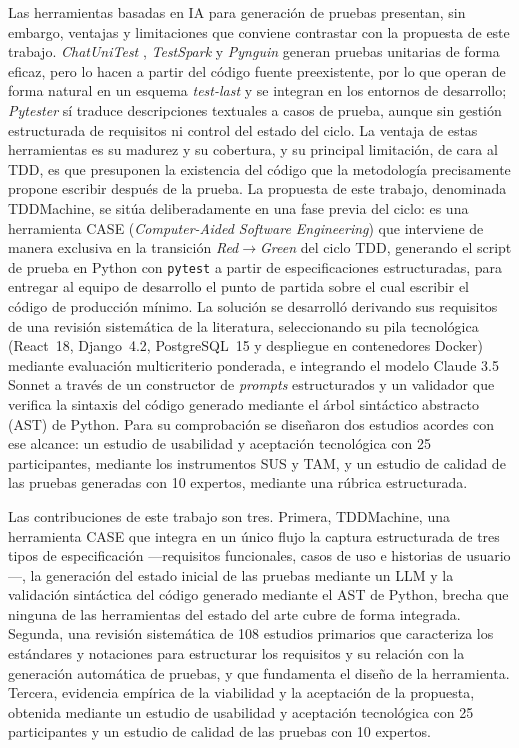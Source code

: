 \documentclass[10pt,journal,twoside,letterpaper]{IEEEtran}
\begin{document}
	Las herramientas basadas en IA para generación de pruebas presentan, sin embargo, ventajas y limitaciones que conviene contrastar con la propuesta de este trabajo. \emph{ChatUniTest} \cite{chen2024chatunitest}, \emph{TestSpark} \cite{sapozhnikov2024testspark} y \emph{Pynguin} \cite{lukasczyk2022pynguin} generan pruebas unitarias de forma eficaz, pero lo hacen a partir del código fuente preexistente, por lo que operan de forma natural en un esquema \emph{test-last} y se integran en los entornos de desarrollo; \emph{Pytester} \cite{takerngsaksiri2025pytester} sí traduce descripciones textuales a casos de prueba, aunque sin gestión estructurada de requisitos ni control del estado del ciclo. La ventaja de estas herramientas es su madurez y su cobertura, y su principal limitación, de cara al TDD, es que presuponen la existencia del código que la metodología precisamente propone escribir después de la prueba. La propuesta de este trabajo, denominada TDDMachine, se sitúa deliberadamente en una fase previa del ciclo: es una herramienta CASE (\emph{Computer-Aided Software Engineering}) que interviene de manera exclusiva en la transición \emph{Red}$\rightarrow$\emph{Green} del ciclo TDD, generando el script de prueba en Python con \texttt{pytest} a partir de especificaciones estructuradas, para entregar al equipo de desarrollo el punto de partida sobre el cual escribir el código de producción mínimo. La solución se desarrolló derivando sus requisitos de una revisión sistemática de la literatura, seleccionando su pila tecnológica (React~18, Django~4.2, PostgreSQL~15 y despliegue en contenedores Docker) mediante evaluación multicriterio ponderada, e integrando el modelo Claude 3.5 Sonnet a través de un constructor de \emph{prompts} estructurados y un validador que verifica la sintaxis del código generado mediante el árbol sintáctico abstracto (AST) de Python. Para su comprobación se diseñaron dos estudios acordes con ese alcance: un estudio de usabilidad y aceptación tecnológica con 25 participantes, mediante los instrumentos SUS y TAM, y un estudio de calidad de las pruebas generadas con 10 expertos, mediante una rúbrica estructurada.

	Las contribuciones de este trabajo son tres. Primera, TDDMachine, una herramienta CASE que integra en un único flujo la captura estructurada de tres tipos de especificación ---requisitos funcionales, casos de uso e historias de usuario---, la generación del estado inicial de las pruebas mediante un LLM y la validación sintáctica del código generado mediante el AST de Python, brecha que ninguna de las herramientas del estado del arte cubre de forma integrada. Segunda, una revisión sistemática de 108 estudios primarios que caracteriza los estándares y notaciones para estructurar los requisitos y su relación con la generación automática de pruebas, y que fundamenta el diseño de la herramienta. Tercera, evidencia empírica de la viabilidad y la aceptación de la propuesta, obtenida mediante un estudio de usabilidad y aceptación tecnológica con 25 participantes y un estudio de calidad de las pruebas con 10 expertos.
\end{document}

